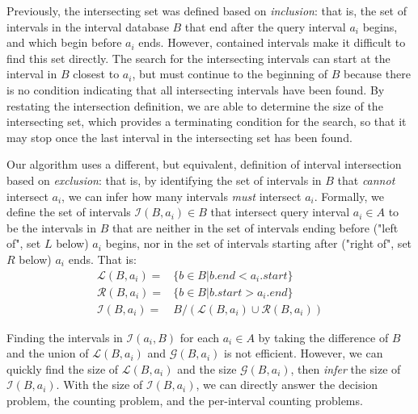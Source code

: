 \documentclass{bioinfo}
\begin{document}
        Previously, the intersecting set was defined based on \emph{inclusion}:
        that is, the set of intervals in the interval database $B$ that end after the query
        interval $a_i$ begins, and which begin before $a_i$ ends.  However,
        contained intervals make it difficult to find this set directly.  The
        search for the intersecting intervals can start at the interval in $B$
        closest to $a_i$, but must continue to the beginning of $B$ because
        there is no condition indicating that all intersecting intervals have
        been found.  By restating the intersection definition, we are able to
        determine the size of the intersecting set, which provides a
        terminating condition for the search, so that it may stop once the
        last interval in the intersecting set has been found.

        Our algorithm uses a different, but equivalent, definition of interval
        intersection based on \emph{exclusion}: that is, by identifying the set of 
        intervals in $B$ that \emph{cannot} intersect $a_i$, we can infer how many intervals
        \emph{must} intersect $a_i$. Formally, we define the set of intervals $\mathcal{I}(B,a_i) \in B$ that
        intersect query interval $a_i\in A$ to be the intervals in $B$ that
        are neither in the set of intervals ending before ("left of", set $L$ below) $a_i$ begins,
        nor in the set of intervals starting after ("right of", set $R$ below) $a_i$ ends.  That is:
        \begin{equation*}
                \begin{split}
                        \mathcal{L}(B,a_i) = &\{b\in B| b.end < a_i.start\} \\
                        \mathcal{R}(B,a_i) = &\{b\in B| b.start > a_i.end\} \\
                        \mathcal{I}(B,a_i) = &B / (\mathcal{L}(B,a_i) \cup \mathcal{R}(B,a_i))
                \end{split}
        \end{equation*}

        Finding the intervals in $\mathcal{I}(a_i,B)$ for each $a_i\in A$ by
        taking the difference of $B$ and the union of $\mathcal{L}(B,a_i)$ and
        $\mathcal{G}(B,a_i)$ is not efficient.  However, we can quickly find
        the size of $\mathcal{L}(B,a_i)$ and the size $\mathcal{G}(B,a_i)$,
        then \emph{infer} the size of $\mathcal{I}(B,a_i)$.  With the size of
        $\mathcal{I}(B,a_i)$, we can directly answer the decision problem, the
        counting problem, and the per-interval counting problems.
\end{document}
